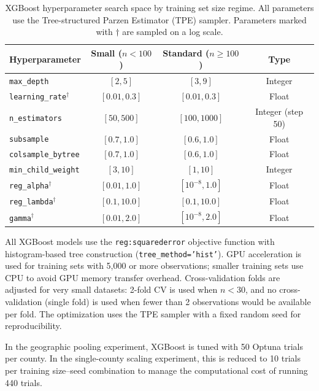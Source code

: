 \begin{table}[ht]
\centering
\caption{XGBoost hyperparameter search space by training set size regime. All parameters use the Tree-structured Parzen Estimator (TPE) sampler. Parameters marked with $\dagger$ are sampled on a log scale.}
\label{tab:xgboost_params}
\begin{tabular}{lccc}
\toprule
\textbf{Hyperparameter} & \textbf{Small ($n < 100$)} & \textbf{Standard ($n \geq 100$)} & \textbf{Type} \\
\midrule
\texttt{max\_depth}          & $[2, 5]$            & $[3, 9]$             & Integer \\
\texttt{learning\_rate}$^\dagger$     & $[0.01, 0.3]$       & $[0.01, 0.3]$        & Float \\
\texttt{n\_estimators}       & $[50, 500]$         & $[100, 1000]$        & Integer (step 50) \\
\texttt{subsample}           & $[0.7, 1.0]$        & $[0.6, 1.0]$         & Float \\
\texttt{colsample\_bytree}   & $[0.7, 1.0]$        & $[0.6, 1.0]$         & Float \\
\texttt{min\_child\_weight}  & $[3, 10]$           & $[1, 10]$            & Integer \\
\texttt{reg\_alpha}$^\dagger$         & $[0.01, 1.0]$       & $[10^{-8}, 1.0]$     & Float \\
\texttt{reg\_lambda}$^\dagger$        & $[0.1, 10.0]$       & $[0.1, 10.0]$        & Float \\
\texttt{gamma}$^\dagger$              & $[0.01, 2.0]$       & $[10^{-8}, 2.0]$     & Float \\
\bottomrule
\end{tabular}
\end{table}

All XGBoost models use the \texttt{reg:squarederror} objective function with histogram-based tree construction (\texttt{tree\_method='hist'}). GPU acceleration is used for training sets with 5,000 or more observations; smaller training sets use CPU to avoid GPU memory transfer overhead. Cross-validation folds are adjusted for very small datasets: 2-fold CV is used when $n < 30$, and no cross-validation (single fold) is used when fewer than 2 observations would be available per fold. The optimization uses the TPE sampler with a fixed random seed for reproducibility.

In the geographic pooling experiment, XGBoost is tuned with 50 Optuna trials per county. In the single-county scaling experiment, this is reduced to 10 trials per training size--seed combination to manage the computational cost of running 440 trials.

